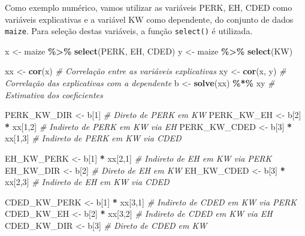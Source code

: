 \documentclass[
]{book}
\makeatletter
\newenvironment{Shaded}{\begin{snugshade}}{\end{snugshade}}
\newcommand{\CommentTok}[1]{\textcolor[rgb]{0.56,0.35,0.01}{\textit{#1}}}
\newcommand{\DecValTok}[1]{\textcolor[rgb]{0.00,0.00,0.81}{#1}}
\newcommand{\KeywordTok}[1]{\textcolor[rgb]{0.13,0.29,0.53}{\textbf{#1}}}
\newcommand{\NormalTok}[1]{#1}
\newcommand{\OperatorTok}[1]{\textcolor[rgb]{0.81,0.36,0.00}{\textbf{#1}}}
\newcommand{\StringTok}[1]{\textcolor[rgb]{0.31,0.60,0.02}{#1}}
\numberwithin{equation}{section}
\newcommand{\indf}[1]{\index[function]{#1@\texttt{#1()}|ST}}
\makeatother
\begin{document}
Como exemplo numérico, vamos utilizar as variáveis PERK, EH, CDED como variáveis explicativas e a variável KW como dependente, do conjunto de dados \texttt{maize}. Para seleção destas variáveis, a função \texttt{select()}\indf{select} é utilizada.

\begin{Shaded}
\begin{Highlighting}[]
\NormalTok{x \textless{}{-}}\StringTok{ }\NormalTok{maize }\OperatorTok{\%\textgreater{}\%}\StringTok{ }\KeywordTok{select}\NormalTok{(PERK, EH, CDED)}
\NormalTok{y \textless{}{-}}\StringTok{ }\NormalTok{maize }\OperatorTok{\%\textgreater{}\%}\StringTok{ }\KeywordTok{select}\NormalTok{(KW)}

\NormalTok{xx \textless{}{-}}\StringTok{ }\KeywordTok{cor}\NormalTok{(x) }\CommentTok{\# Correlação entre as variáveis explicativas}
\NormalTok{xy \textless{}{-}}\StringTok{ }\KeywordTok{cor}\NormalTok{(x, y) }\CommentTok{\# Correlação das explicativas com a dependente}
\NormalTok{b \textless{}{-}}\StringTok{ }\KeywordTok{solve}\NormalTok{(xx) }\OperatorTok{\%*\%}\StringTok{ }\NormalTok{xy }\CommentTok{\# Estimativa dos coeficientes}

\NormalTok{PERK\_KW\_DIR \textless{}{-}}\StringTok{ }\NormalTok{b[}\DecValTok{1}\NormalTok{] }\CommentTok{\# Direto de PERK em KW}
\NormalTok{PERK\_KW\_EH \textless{}{-}}\StringTok{ }\NormalTok{b[}\DecValTok{2}\NormalTok{] }\OperatorTok{*}\StringTok{ }\NormalTok{xx[}\DecValTok{1}\NormalTok{,}\DecValTok{2}\NormalTok{] }\CommentTok{\# Indireto de PERK em KW via EH}
\NormalTok{PERK\_KW\_CDED \textless{}{-}}\StringTok{ }\NormalTok{b[}\DecValTok{3}\NormalTok{] }\OperatorTok{*}\StringTok{ }\NormalTok{xx[}\DecValTok{1}\NormalTok{,}\DecValTok{3}\NormalTok{] }\CommentTok{\# Indireto de PERK em KW via CDED}

\NormalTok{EH\_KW\_PERK \textless{}{-}}\StringTok{ }\NormalTok{b[}\DecValTok{1}\NormalTok{] }\OperatorTok{*}\StringTok{ }\NormalTok{xx[}\DecValTok{2}\NormalTok{,}\DecValTok{1}\NormalTok{] }\CommentTok{\# Indireto de EH em KW via PERK}
\NormalTok{EH\_KW\_DIR \textless{}{-}}\StringTok{ }\NormalTok{b[}\DecValTok{2}\NormalTok{] }\CommentTok{\# Direto de EH em KW}
\NormalTok{EH\_KW\_CDED \textless{}{-}}\StringTok{ }\NormalTok{b[}\DecValTok{3}\NormalTok{] }\OperatorTok{*}\StringTok{ }\NormalTok{xx[}\DecValTok{2}\NormalTok{,}\DecValTok{3}\NormalTok{] }\CommentTok{\# Indireto de EH em KW via CDED}

\NormalTok{CDED\_KW\_PERK \textless{}{-}}\StringTok{ }\NormalTok{b[}\DecValTok{1}\NormalTok{] }\OperatorTok{*}\StringTok{ }\NormalTok{xx[}\DecValTok{3}\NormalTok{,}\DecValTok{1}\NormalTok{] }\CommentTok{\# Indireto de CDED em KW via PERK}
\NormalTok{CDED\_KW\_EH \textless{}{-}}\StringTok{ }\NormalTok{b[}\DecValTok{2}\NormalTok{] }\OperatorTok{*}\StringTok{ }\NormalTok{xx[}\DecValTok{3}\NormalTok{,}\DecValTok{2}\NormalTok{] }\CommentTok{\# Indireto de CDED em KW via EH}
\NormalTok{CDED\_KW\_DIR \textless{}{-}}\StringTok{ }\NormalTok{b[}\DecValTok{3}\NormalTok{] }\CommentTok{\# Direto de CDED em KW}


\end{Highlighting}
\end{Shaded}
\end{document}
